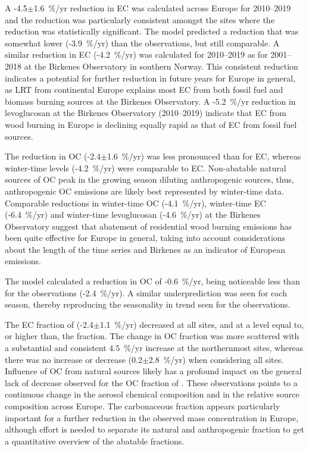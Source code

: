 
A -4.5$\pm$1.6~\%/yr reduction in EC was calculated across Europe for
2010--2019 and the reduction was particularly consistent amongst the
sites where the reduction was statistically significant. The model
predicted a reduction that was somewhat lower (-3.9~\%/yr) than the
observations, but still comparable. A similar reduction in EC (-4.2~\%/yr)
was calculated for 2010--2019 as for 2001--2018 at the Birkenes
Observatory in southern Norway. This consistent reduction indicates a
potential for further reduction in future years for Europe in general,
as LRT from continental Europe explains most EC from both fossil fuel
and biomass burning sources at the Birkenes Observatory. A  -5.2~\%/yr
reduction in levoglucosan at the Birkenes Observatory (2010--2019)
 indicate that EC from wood burning in Europe is declining equally
rapid as that of EC from fossil fuel sources.

The reduction in OC (-2.4$\pm$1.6~\%/yr) was less pronounced than for EC,
whereas winter-time levels (-4.2~\%/yr) were comparable to EC. Non-abatable
natural sources of OC peak in the growing season diluting anthropogenic
sources, thus, anthropogenic OC emissions are likely best represented by
winter-time data. Comparable reductions in winter-time OC (-4.1~\%/yr),
winter-time EC (-6.4~\%/yr) and winter-time levoglucosan (-4.6~\%/yr)
at the Birkenes Observatory suggest that abatement of residential
wood burning emissions has been quite effective for Europe in general,
taking into account considerations about the length of the time series
and Birkenes as an indicator of European emissions.

The model calculated a reduction in OC of -0.6~\%/yr, being noticeable
less than for the observations (-2.4~\%/yr). A similar underprediction
was seen for each season, thereby reproducing the seasonality in trend
seen for the observations.

The EC fraction of \pmfine (-2.4$\pm$1.1~\%/yr) decreased at all
sites, and at a level equal to, or higher than, the  fraction. The
change in OC fraction was more scattered with a substantial and
consistent 4.5~\%/yr increase at the northernmost sites, whereas
there was no increase or decrease (0.2$\pm$2.8~\%/yr) when considering
all sites. Influence of OC from natural sources likely has a profound
impact on the general lack of decrease observed for the OC fraction of
\pmfine. These observations points to a continuous change in the aerosol
chemical composition and in the relative source composition across
Europe. The carbonaceous fraction appears particularly important for a
further reduction in the observed \pmfine mass concentration in Europe,
although effort is needed to separate its natural and anthropogenic
fraction to get a quantitative overview of the abatable fractions.\\



